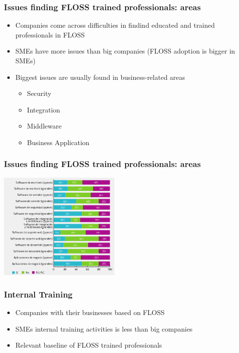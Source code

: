 \documentclass{beamer}
\begin{document}

\begin{frame}
\frametitle{Issues finding FLOSS trained professionals: areas}
\begin{itemize}
\item Companies come across difficulties in findind educated and trained professionals in FLOSS
\item SMEs have more issues than big companies (FLOSS adoption is bigger in SMEs)
\item Biggest issues are usually found in business-related areas
   \begin{itemize}
   \item Security
   \item Integration
   \item Middleware
   \item Business Application
   \end{itemize}
\end{itemize}
\end{frame}


\begin{frame}
\frametitle{Issues finding FLOSS trained professionals: areas}
\begin{center}
  \includegraphics[width=6cm]{figs/cenatic_trainedprofessionals.png}
\end{center}
\end{frame}


\begin{frame}
\frametitle{Internal Training}
\begin{itemize}
\item Companies with their businesses based on FLOSS
\item SMEs internal training activities is less than big companies
\item Relevant baseline of FLOSS trained professionals
\end{itemize}
\end{frame}
\end{document}
